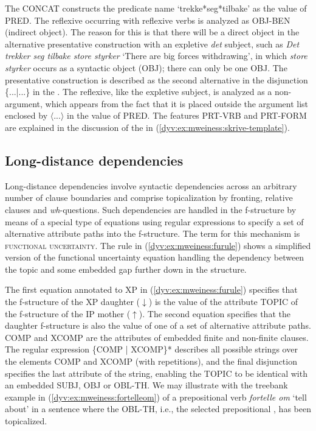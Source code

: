 \documentclass[output=paper]{langsci/langscibook}
\begin{document}
The  CONCAT constructs the predicate name `trekke*seg*tilbake' as the value of PRED.
The reflexive occurring with reflexive verbs is analyzed as OBJ-BEN (indirect object).
The reason for this is that there will be a direct object in the alternative presentative construction with an expletive \textit{det} subject, such as \textit{Det trekker seg tilbake store styrker} `There are big forces withdrawing', in which \textit{store styrker} occurs as a syntactic object (OBJ); there can only be one OBJ.
The presentative construction is described as the second alternative in the disjunction \{...|...\} in the .
The reflexive, like the expletive subject, is analyzed as a non-argument, which appears from the fact that it is placed outside the argument list enclosed by $\langle$...$\rangle$ in the value of PRED.
The features PRT-VRB and PRT-FORM are explained in the discussion of the  in (\ref{dyv:ex:mweiness:skrive-template}).

\subsection{Long-distance dependencies}\label{dyv:sec:mweiness:longdist}

Long-distance dependencies involve syntactic dependencies across an arbitrary number of clause boundaries and comprise topicalization by fronting, relative clauses and \textit{wh}-questions.
Such dependencies are handled in the f-structure by means of a special type of equations using regular expressions to specify a set of alternative attribute paths into the f-structure.
The term for this mechanism is \textsc{functional uncertainty}.
The rule in (\ref{dyv:ex:mweiness:furule}) shows a simplified version of the functional uncertainty equation handling the dependency between the topic and some embedded gap further down in the structure.


The first equation annotated to XP in (\ref{dyv:ex:mweiness:furule}) specifies that the f-structure of the XP daughter ($\downarrow$) is the value of the attribute TOPIC of the f-structure of the IP mother ($\uparrow$).
The second equation specifies that the daughter f-structure is also the value of one of a set of alternative attribute paths.
COMP and XCOMP are the attributes of embedded finite and non-finite clauses.
The regular expression \{COMP | XCOMP\}* describes all possible strings over the elements COMP and XCOMP (with repetitions), and the final disjunction specifies the last attribute of the string, enabling the TOPIC to be identical with an embedded SUBJ, OBJ or OBL-TH.
We may illustrate with the treebank example in (\ref{dyv:ex:mweiness:fortelleom}) of a prepositional verb \textit{fortelle om} `tell about' in a sentence where the OBL-TH, i.e., the selected prepositional , has been topicalized.
\end{document}
